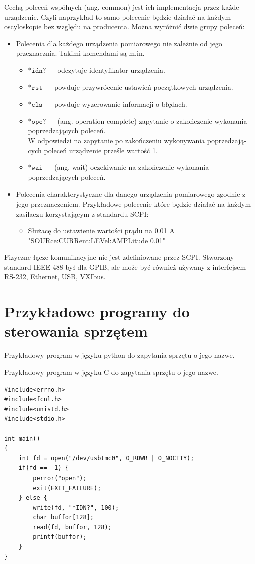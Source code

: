 \documentclass[a4paper, portrait,12pt]{report}
\begin{document}
Cechą  poleceń  wspólnych  (ang.  common)  jest  ich  implementacja  przez  każde urządzenie. Czyli naprzykład to samo polecenie będzie działać na każdym oscyloskopie bez względu na producenta. Można wyróżnić dwie grupy poleceń:
\begin{itemize}
\item Polecenia dla każdego urządzenia pomiarowego nie zależnie od jego przeznacznia. Takimi komendami są m.in.
\begin{itemize}
\item $\mathtt{*idn?}$ --- odczytuje identyfikator urządzenia. 
\item $\mathtt{*rst}$ --- powduje przywrócenie ustawień początkowych urządzenia.
\item $\mathtt{*cls}$ --- powduje wyzerowanie informacji o błędach.
\item $\mathtt{*opc?}$  --- (ang.  operation  complete)  zapytanie  o  zakończenie  wykonania
poprzedzających poleceń. \\
W  odpowiedzi  na  zapytanie  po  zakończeniu  wykonywania  poprzedzają-
cych poleceń urządzenie prześle wartość 1.
\item $\mathtt{*wai}$ ---  (ang.  wait)  oczekiwanie  na  zakończenie  wykonania  poprzedzających poleceń.
\end{itemize}

\item Polecenia charakterystyczne dla danego urządzenia pomiarowego zgodnie z jego przeznaczeniem. Przykładowe polecenie które będzie działać na każdym zasilaczu korzystającym z standardu SCPI:
\begin{itemize}
\item Służacę do ustawienie wartości prądu na 0.01 A \\ "SOURce:CURRent:LEVel:AMPLitude  0.01" 
\end{itemize}
\end{itemize}

Fizyczne łącze komunikacyjne nie jest zdefiniowane przez SCPI. Stworzony standard IEEE-488 był dla GPIB, ale może być również używany z interfejsem RS-232, Ethernet, USB, VXIbus.
\newpage
\section{Przykładowe programy do sterowania sprzętem}
Przykładowy program w języku python do zapytania sprzętu o jego nazwe.

Przykładowy program w języku C do zapytania sprzętu o jego nazwe.
\begin{lstlisting}
#include<errno.h>
#include<fcnl.h>
#include<unistd.h>
#include<stdio.h>

int main()
{
    int fd = open("/dev/usbtmc0", O_RDWR | O_NOCTTY);
    if(fd == -1) {
        perror("open");
        exit(EXIT_FAILURE);
    } else {
        write(fd, "*IDN?", 100);
        char buffor[128];
        read(fd, buffor, 128);
        printf(buffor);
    }
}

\end{lstlisting}
\end{document}
